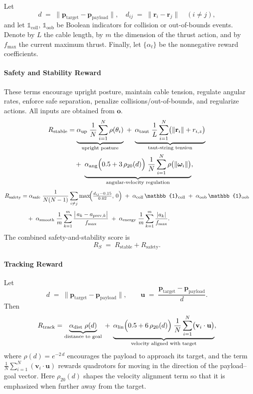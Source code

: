 Let 
\[
d \;=\; \bigl\|\mathbf{p}_{\mathrm{target}} - \mathbf{p}_{\mathrm{payload}}\bigr\|,\quad
d_{ij} \;=\; \bigl\|\mathbf{r}_i - \mathbf{r}_j\bigr\|\quad(i\neq j),
\]
and let $\mathbb{1}_{\mathrm{coll}}$, $\mathbb{1}_{\mathrm{oob}}$ be Boolean indicators for collision or out-of-bounds events.  Denote by $L$ the cable length, by $m$ the dimension of the thrust action, and by $f_{\max}$ the current maximum thrust.  Finally, let $\{\alpha_t\}$ be the nonnegative reward coefficients.

\paragraph{Safety and Stability Reward}
These terms encourage upright posture, maintain cable tension, regulate angular rates, enforce safe separation, penalize collisions/out-of-bounds, and regularize actions.  All inputs are obtained from $\mathbf{o}$.
\[
\begin{aligned}
R_{\mathrm{stable}}
&= \underbrace{\alpha_{\mathrm{up}}\;\frac{1}{N}\sum_{i=1}^N \rho(\theta_i)}_{\text{upright posture}}
\;+\;\underbrace{\alpha_{\mathrm{taut}}\;\frac{1}{L}\sum_{i=1}^N \bigl(\|\mathbf{r}_i\| + r_{i,z}\bigr)}_{\text{taut-string tension}}\\
&\quad+\;\underbrace{\alpha_{\mathrm{ang}}\Bigl(0.5 + 3\,\rho_{20}(d)\Bigr)\;\frac{1}{N}\sum_{i=1}^N \rho\bigl(\|\boldsymbol\omega_i\|\bigr)}_{\text{angular-velocity regulation}},
\end{aligned}
\]
\[
\begin{aligned}
R_{\mathrm{safety}}
&=
\alpha_{\mathrm{safe}}\;\frac{1}{N(N-1)}\sum_{i\neq j}\max\!\Bigl(\tfrac{d_{ij} - 0.15}{0.02},\,0\Bigr)
\;+\;\alpha_{\mathrm{coll}}\,\mathbb{1}_{\mathrm{coll}}
\;+\;\alpha_{\mathrm{oob}}\,\mathbb{1}_{\mathrm{oob}}\\[4pt]
&\quad+\;\alpha_{\mathrm{smooth}}\;\frac{1}{m}\sum_{k=1}^m \frac{\bigl|\,a_k - a_{\mathrm{prev},k}\bigr|}{f_{\max}}
\;+\;\alpha_{\mathrm{energy}}\;\frac{1}{m}\sum_{k=1}^m \frac{\lvert a_k\rvert}{f_{\max}}.
\end{aligned}
\]
The combined safety-and-stability score is
\[
R_S \;=\; R_{\mathrm{stable}} + R_{\mathrm{safety}}.
\]

\paragraph{Tracking Reward}
Let 
\[
d \;=\; \bigl\|\mathbf{p}_{\mathrm{target}} - \mathbf{p}_{\mathrm{payload}}\bigr\|,\qquad
\mathbf{u} \;=\; \frac{\mathbf{p}_{\mathrm{target}} - \mathbf{p}_{\mathrm{payload}}}{d}.
\]
Then
\[
R_{\mathrm{track}}
= \underbrace{\alpha_{\mathrm{dist}}\;\rho(d)}_{\text{distance to goal}}
\;+\;\underbrace{\alpha_{\mathrm{lin}}\Bigl(0.5 + 6\,\rho_{20}(d)\Bigr)\;\frac{1}{N}\sum_{i=1}^N \bigl(\mathbf{v}_i \cdot \mathbf{u}\bigr)}_{\text{velocity aligned with target}},
\]
where $\rho(d)=e^{-2\,d}$ encourages the payload to approach its target, and the term $\frac{1}{N}\sum_{i=1}^N (\mathbf{v}_i\cdot\mathbf{u})$ rewards quadrotors for moving in the direction of the payload–goal vector.  Here $\rho_{20}(d)$ shapes the velocity alignment term so that it is emphasized when further away from the target.

